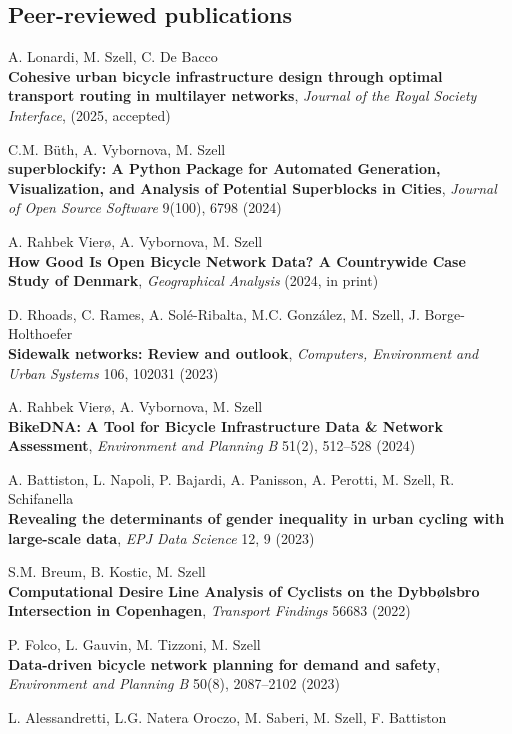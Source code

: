 \documentclass[10pt,a4paper]{article}
\renewenvironment{itemize}{
  \begin{list}{}{
    \setlength{\leftmargin}{1.5em}
    \setlength{\itemsep}{0.25em}
    \setlength{\parskip}{0pt}
    \setlength{\parsep}{0.25em}
  }
}{
  \end{list}
}
\begin{document}
\subsection*{Peer-reviewed publications}
\begin{itemize}
\setlength\itemsep{1em}
\item A. Lonardi, M. Szell, C. De Bacco\\
    \textbf{Cohesive urban bicycle infrastructure design through optimal transport routing in multilayer networks}, \textit{Journal of the Royal Society Interface}, (2025, accepted)
\item C.M. Büth, A. Vybornova, M. Szell\\
    \textbf{superblockify: A Python Package for Automated Generation, Visualization, and Analysis of Potential Superblocks in Cities}, \textit{Journal of Open Source Software} 9(100), 6798 (2024)
\item A. Rahbek Vierø, A. Vybornova, M. Szell\\
    \textbf{How Good Is Open Bicycle Network Data? A Countrywide Case Study of Denmark}, \textit{Geographical Analysis} (2024, in print)
\item D. Rhoads, C. Rames, A. Solé-Ribalta, M.C. González, M. Szell, J. Borge-Holthoefer\\
    \textbf{Sidewalk networks: Review and outlook}, \textit{Computers, Environment and Urban Systems} 106, 102031 (2023)
\item A. Rahbek Vierø, A. Vybornova, M. Szell\\
    \textbf{BikeDNA: A Tool for Bicycle Infrastructure Data \& Network Assessment}, \textit{Environment and Planning B} 51(2), 512--528 (2024)
\item A. Battiston, L. Napoli, P. Bajardi, A. Panisson, A. Perotti, M. Szell, R. Schifanella\\
    \textbf{Revealing the determinants of gender inequality in urban cycling with large-scale data}, \textit{EPJ Data Science} 12, 9 (2023)
\item S.M. Breum, B. Kostic, M. Szell\\
    \textbf{Computational Desire Line Analysis of Cyclists on the Dybbølsbro Intersection in Copenhagen}, \textit{Transport Findings} 56683 (2022)
\item P. Folco, L. Gauvin, M. Tizzoni, M. Szell\\
    \textbf{Data-driven bicycle network planning for demand and safety}, \textit{Environment and Planning B} 50(8), 2087--2102 (2023)
\item L. Alessandretti, L.G. Natera Oroczo, M. Saberi, M. Szell, F. Battiston\\

\end{itemize}
\end{document}
